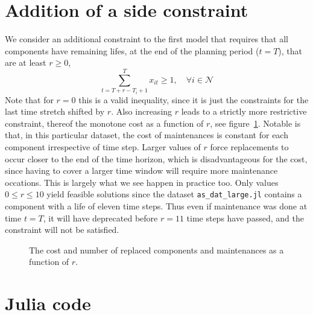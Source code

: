 \documentclass{article}
\begin{document}
\section{Addition of a side constraint}
We consider an additional constraint to the first model
that requires that all components have remaining lifes,
at the end of the planning period ($t=T$),
that are at least $r \ge 0$,
\begin{equation}\tag{MinRemLife}
\sum_{t = T + r - T_i + 1}^T x_{it} \ge 1, \quad \forall i \in \mathcal N
\end{equation}
Note that for $r=0$ this is a valid inequality,
since it is just the constraints for the last time stretch shifted by $r$.
Also increasing $r$ leads to a strictly more restrictive constraint,
thereof the monotone cost as a function of $r$,
see figure~\ref{fig:4b}.
Notable is that, in this particular dataset,
the cost of maintenances is constant for each component
irrespective of time step.
Larger values of $r$ force replacements to occur closer
to the end of the time horizon,
which is disadvantageous for the cost,
since having to cover a larger time window will require more maintenance occations.
This is largely what we see happen in practice too.
Only values $0 \le r \le 10$ yield feasible solutions since
the dataset \verb+as_dat_large.jl+ contains a component with a life
of eleven time steps.
Thus even if maintenance was done at time $t = T$,
it will have deprecated before $r=11$ time steps have passed,
and the constraint will not be satisfied.

\begin{figure}
    \centering
    \label{fig:4b}
    \caption{The cost and number of replaced components and maintenances as a function of $r$.}
\end{figure}

\appendix
\section{Julia code}\label{app:code}


\printbibliography
\end{document}
